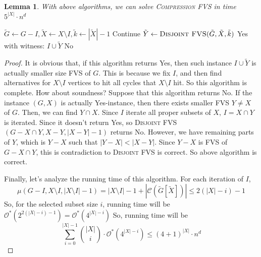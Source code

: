 \documentclass[12pt, a4paper, openany, twoside]{book}
\newtheorem{lem}[thm]{Lemma}
\theoremstyle{definition}
\theoremstyle{remark}
\newcommand{\CC}{{\mathcal {C}}} \newcommand{\CD}{{\mathcal {D}}}
\newcommand{\CO}{{\mathcal {O}}} \newcommand{\CP}{{\mathcal {P}}}
\theoremstyle{plain}
\numberwithin{equation}{section}
\begin{document}
\begin{lem}
    
With above algorithms, we can solve \textsc{Compression FVS} in time $5^{|X|}\cdot n^d$

\end{lem}

\begin{algorithm}
\caption{Algorithm for Compression FVS}
\begin{algorithmic}[1]
\State $\tilde{G} \gets G - I, \tilde{X} \gets X \setminus I, \tilde{k} \gets |\tilde{X}| - 1$
 Continue
\Else 
\State $\tilde{Y} \gets \textsc{Disjoint FVS}(\tilde{G}, \tilde{X}, \tilde{k})$
\State \Return Yes with witness: $I \cup \tilde{Y}$
\EndIf
\EndFor
\State \Return No
\EndProcedure
\end{algorithmic}
\end{algorithm}

\begin{proof}
    
It is obvious that, if this algorithm returns Yes, then such instance $I \cup \tilde{Y}$ is actually 
smaller size FVS of $G$. This is because we fix $I$, and then find alternatives for $X \setminus I$ vertices to hit all cycles that 
$X \setminus I$ hit. So this algorithm is complete. How about soundness? Suppose that this algorithm returns No. 
If the instance $(G, X)$ is actually Yes-instance, then there exists smaller FVS $Y \neq X$ of $G$. 
Then, we can find $Y \cap X$. Since $I$ iterate all proper subsets of $X$, $I = X \cap Y$ is iterated. 
Since it doesn't return Yes, so \textsc{Disjoint FVS}$(G - X\cap Y, X - Y, |X - Y| - 1)$ returns No. 
However, we have remaining parts of $Y$, which is $Y - X$ such that $|Y - X| < |X - Y|$. Since $Y - X$ 
is FVS of $G - X \cap Y$, this is contradiction to \textsc{Disjoint FVS} is correct. So above algorithm is correct. 

Finally, let's analyze the running time of this algorithm. For each iteration of $I$, 
\[\mu(G - I, X \setminus I, |X \setminus I| - 1) = |X \setminus I| - 1 + |\CC(\tilde{G}[\tilde{X}])| \leq 2(|X| - i) - 1\]
So, for the selected subset size $i$, running time will be $\CO^*(2^{2(|X|-i)-1}) = \CO^*(4^{|X|-i})$
So, running time will be 
\[\sum_{i=0}^{|X|-1}\binom{|X|}{i} \cdot \CO^*(4^{|X|-i}) \leq (4 + 1)^{|X|}\cdot n^d\]


\end{proof}
\end{document}
